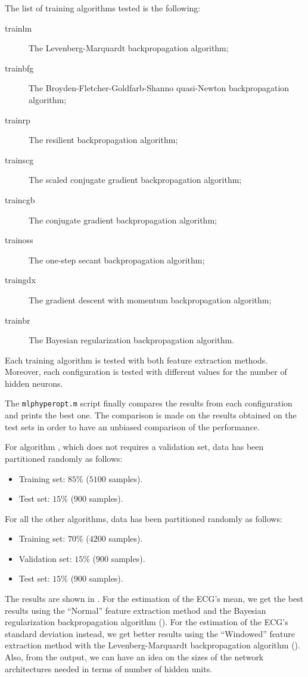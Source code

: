 The list of training algorithms tested is the following:
\begin{description}
\item[trainlm] The Levenberg-Marquardt backpropagation algorithm;
\item[trainbfg] The Broyden-Fletcher-Goldfarb-Shanno quasi-Newton
	backpropagation algorithm;
\item[trainrp] The resilient backpropagation algorithm;
\item[trainscg] The scaled conjugate gradient backpropagation algorithm;
\item[traincgb] The conjugate gradient backpropagation algorithm;
\item[trainoss] The one-step secant backpropagation algorithm;
\item[traingdx] The gradient descent with momentum backpropagation algorithm;
\item[trainbr] The Bayesian regularization backpropagation algorithm.
\end{description}

Each training algorithm is tested with both feature extraction methods.
Moreover, each configuration is tested with different values for the number of
hidden neurons.

The \texttt{mlphyperopt.m} script finally compares the results from each
configuration and prints the best one. The comparison is made on the results
obtained on the test sets in order to have an unbiased comparison of the
performance.

For algorithm , which does not requires a validation set, data
has been partitioned randomly as follows:
\begin{itemize}
\item Training set: \(85\%\) (\(5100\) samples).
\item Test set: \(15\%\) (\(900\) samples).
\end{itemize}
For all the other algorithms, data has been partitioned randomly as follows:
\begin{itemize}
\item Training set: \(70\%\) (\(4200\) samples).
\item Validation set: \(15\%\) (\(900\) samples).
\item Test set: \(15\%\) (\(900\) samples).
\end{itemize}

The results are shown in . For the estimation of the
ECG's mean, we get the best results using the ``Normal'' feature extraction
method and the Bayesian regularization backpropagation algorithm
(). For the estimation of the ECG's standard deviation instead,
we get better results using the ``Windowed'' feature extraction method with the
Levenberg-Marquardt backpropagation algorithm (). Also, from the
output, we can have an idea on the sizes of the network architectures needed in
terms of number of hidden units.

